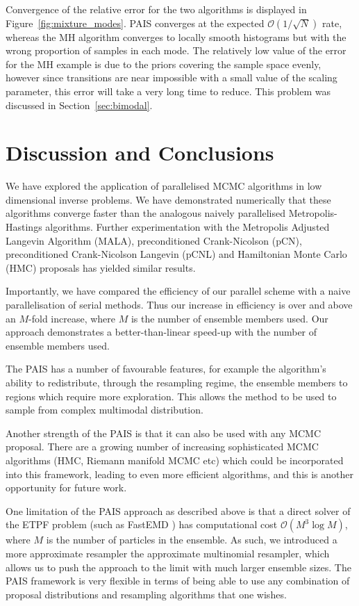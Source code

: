 \documentclass[final]{siamltex}
\begin{document}
Convergence of the relative error for the two algorithms is displayed in Figure~\ref{fig:mixture_modes}. PAIS converges at the expected $\mathcal{O}(1/\sqrt{N})$ rate, whereas the MH algorithm converges to locally smooth histograms but with the wrong proportion of samples in each mode. The relatively low value of the error for the MH example is due to the priors covering the sample space evenly, however since transitions are near impossible with a small value of the scaling parameter, this error will take a very long time to reduce. This problem was discussed in Section~\ref{sec:bimodal}.

\section{Discussion and Conclusions}\label{Sec:Conc} 

We have explored the application of parallelised MCMC algorithms in
low dimensional inverse problems. We have demonstrated numerically
that these algorithms converge faster than the analogous naively parallelised
Metropolis-Hastings algorithms. Further experimentation with the Metropolis
Adjusted Langevin Algorithm (MALA), preconditioned Crank-Nicolson (pCN),
preconditioned Crank-Nicolson Langevin (pCNL) and Hamiltonian
Monte Carlo (HMC) proposals has yielded similar results\cite{Paul}.

Importantly, we have compared the efficiency of our parallel scheme
with a naive parallelisation of serial methods. Thus our increase in
efficiency is over and above an $M$-fold increase, where $M$ is the
number of ensemble members used. Our approach
demonstrates a better-than-linear speed-up with the number of ensemble
members used. 

The PAIS has a number of favourable features, for example the
algorithm's ability to redistribute, through the resampling regime,
the ensemble members to regions which require more exploration. This allows the
method to be used to sample from complex multimodal distribution.

Another strength of the PAIS is that it can also be used with any MCMC
proposal. There are a growing number of increasing sophisticated MCMC
algorithms (HMC, Riemann manifold MCMC etc) which could be
incorporated into this framework, leading to even more efficient
algorithms, and this is another opportunity for future work. 

One limitation of the PAIS approach as described above is that a
direct solver of the ETPF problem (such as FastEMD \cite{FastEMD}) has computational cost
$\mathcal{O}(M^3\log M)$, where $M$ is the number of particles in the
ensemble. As such, we introduced a more approximate resampler the
approximate multinomial resampler, which allows us to push the
approach to the limit
with much larger ensemble sizes. The PAIS framework is very flexible
in terms of being able to use any combination of proposal
distributions and resampling algorithms that one wishes.



\end{document}
